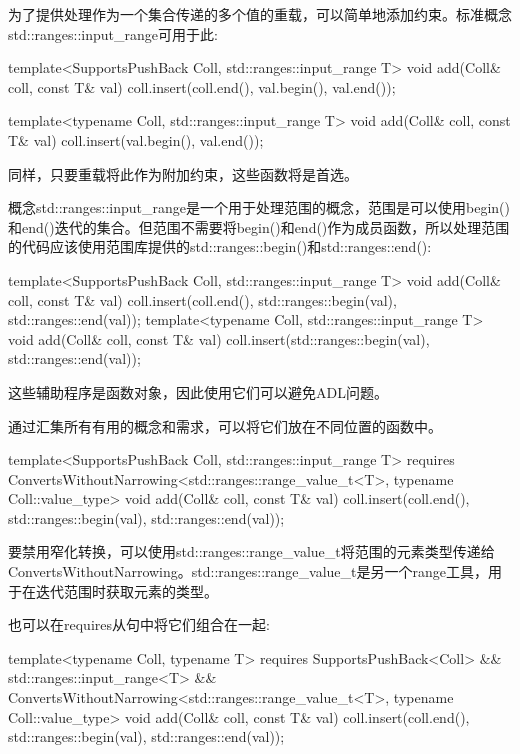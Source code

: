 为了提供处理作为一个集合传递的多个值的重载，可以简单地添加约束。标准概念std::ranges::input\_range可用于此:

\begin{cpp}
template<SupportsPushBack Coll, std::ranges::input_range T>
void add(Coll& coll, const T& val)
{
	coll.insert(coll.end(), val.begin(), val.end());
}

template<typename Coll, std::ranges::input_range T>
void add(Coll& coll, const T& val)
{
	coll.insert(val.begin(), val.end());
}
\end{cpp}

同样，只要重载将此作为附加约束，这些函数将是首选。

概念std::ranges::input\_range是一个用于处理范围的概念，范围是可以使用begin()和end()迭代的集合。但范围不需要将begin()和end()作为成员函数，所以处理范围的代码应该使用范围库提供的std::ranges::begin()和std::ranges::end():

\begin{cpp}
template<SupportsPushBack Coll, std::ranges::input_range T>
void add(Coll& coll, const T& val)
{
	coll.insert(coll.end(), std::ranges::begin(val), std::ranges::end(val));
}
template<typename Coll, std::ranges::input_range T>
void add(Coll& coll, const T& val)
{
	coll.insert(std::ranges::begin(val), std::ranges::end(val));
}
\end{cpp}

这些辅助程序是函数对象，因此使用它们可以避免ADL问题。


通过汇集所有有用的概念和需求，可以将它们放在不同位置的函数中。

\begin{cpp}
template<SupportsPushBack Coll, std::ranges::input_range T>
requires ConvertsWithoutNarrowing<std::ranges::range_value_t<T>,
typename Coll::value_type>
void add(Coll& coll, const T& val)
{
	coll.insert(coll.end(),
				std::ranges::begin(val), std::ranges::end(val));
}
\end{cpp}

要禁用窄化转换，可以使用std::ranges::range\_value\_t将范围的元素类型传递给ConvertsWithoutNarrowing。std::ranges::range\_value\_t是另一个range工具，用于在迭代范围时获取元素的类型。

也可以在requires从句中将它们组合在一起:

\begin{cpp}
template<typename Coll, typename T>
requires SupportsPushBack<Coll> &&
			std::ranges::input_range<T> &&
			ConvertsWithoutNarrowing<std::ranges::range_value_t<T>,
							typename Coll::value_type>
void add(Coll& coll, const T& val)
{
	coll.insert(coll.end(),
				std::ranges::begin(val), std::ranges::end(val));
}
\end{cpp}

